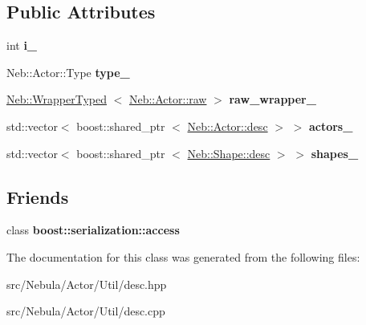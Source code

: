 \subsection*{\-Public \-Attributes}
\begin{DoxyCompactItemize}
\item 
\hypertarget{classNeb_1_1Actor_1_1desc_af7d106ed36afbc55f0f9c88d18d58515}{int {\bfseries i\-\_\-}}\label{classNeb_1_1Actor_1_1desc_af7d106ed36afbc55f0f9c88d18d58515}

\item 
\hypertarget{classNeb_1_1Actor_1_1desc_aafd307945d7669b1502800990941cb1a}{\-Neb\-::\-Actor\-::\-Type {\bfseries type\-\_\-}}\label{classNeb_1_1Actor_1_1desc_aafd307945d7669b1502800990941cb1a}

\item 
\hypertarget{classNeb_1_1Actor_1_1desc_a479c90f717a4b8bef46229f12a16112d}{\hyperlink{classNeb_1_1WrapperTyped}{\-Neb\-::\-Wrapper\-Typed}\*
$<$ \hyperlink{classNeb_1_1Actor_1_1raw}{\-Neb\-::\-Actor\-::raw} $>$ {\bfseries raw\-\_\-wrapper\-\_\-}}\label{classNeb_1_1Actor_1_1desc_a479c90f717a4b8bef46229f12a16112d}

\item 
\hypertarget{classNeb_1_1Actor_1_1desc_a4d2296cea02b4f849666f5dbc2e1f518}{std\-::vector$<$ boost\-::shared\-\_\-ptr\*
$<$ \hyperlink{classNeb_1_1Actor_1_1desc}{\-Neb\-::\-Actor\-::desc} $>$ $>$ {\bfseries actors\-\_\-}}\label{classNeb_1_1Actor_1_1desc_a4d2296cea02b4f849666f5dbc2e1f518}

\item 
\hypertarget{classNeb_1_1Actor_1_1desc_a7b64dddbc1bde71d494cdbf75baee32e}{std\-::vector$<$ boost\-::shared\-\_\-ptr\*
$<$ \hyperlink{classNeb_1_1Shape_1_1desc}{\-Neb\-::\-Shape\-::desc} $>$ $>$ {\bfseries shapes\-\_\-}}\label{classNeb_1_1Actor_1_1desc_a7b64dddbc1bde71d494cdbf75baee32e}

\end{DoxyCompactItemize}
\subsection*{\-Friends}
\begin{DoxyCompactItemize}
\item 
\hypertarget{classNeb_1_1Actor_1_1desc_ac98d07dd8f7b70e16ccb9a01abf56b9c}{class {\bfseries boost\-::serialization\-::access}}\label{classNeb_1_1Actor_1_1desc_ac98d07dd8f7b70e16ccb9a01abf56b9c}

\end{DoxyCompactItemize}


\-The documentation for this class was generated from the following files\-:\begin{DoxyCompactItemize}
\item 
src/\-Nebula/\-Actor/\-Util/desc.\-hpp\item 
src/\-Nebula/\-Actor/\-Util/desc.\-cpp\end{DoxyCompactItemize}
